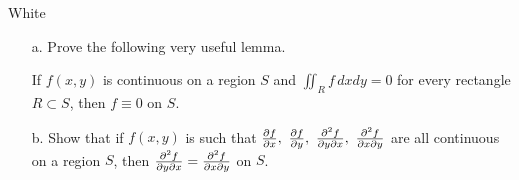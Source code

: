 \documentclass[titlepage]{article}
\begin{document}
\begin{cproblem}{2}{White}
\ \\
\vspace{-1em}
\begin{itemize}
\item[a.] Prove the following very useful lemma.
\vspace{-1em}
\begin{lemma}{1}\label{sec:1} If $f(x,y)$ is continuous on a region $S$ and $\iint_{R} f\, dx dy = 0$ for every rectangle $R \subset S$, then $f \equiv 0$ on $S$.\end{lemma}
\item[b.] Show that if $f(x,y)$ is such that $\frac{\partial f}{\partial x}, \ \frac{\partial f}{\partial y}, \ \frac{\partial^2 f}{\partial y \partial x}, \ \frac{\partial^2 f}{\partial x \partial y}$ are all continuous on a region $S$, then $\frac{\partial^2 f}{\partial y \partial x} = \frac{\partial^2 f}{\partial x \partial y}$ on $S$.
\end{itemize}
\end{cproblem}
\end{document}
